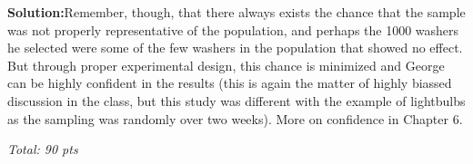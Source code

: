 \documentclass[11pt]{article}\usepackage[]{graphicx}\usepackage[]{color}
\begin{document}
\begin{enumerate}
\begin{enumerate}
    \textbf{Solution:}Remember, though, that there always exists the chance that the sample
was not properly representative of the population, and perhaps 
the 1000 washers he selected 
were some of the few washers in the population
that showed no effect. 
But through proper
experimental design, this chance is minimized and George can 
be highly confident in the results (this is again the matter of highly biassed discussion in the class, but this study was different with the example of lightbulbs as the sampling was randomly over two weeks). More on confidence in Chapter 6.
    

    \end{enumerate}


\end{enumerate}

\emph{Total: 90 pts}
\end{document}

